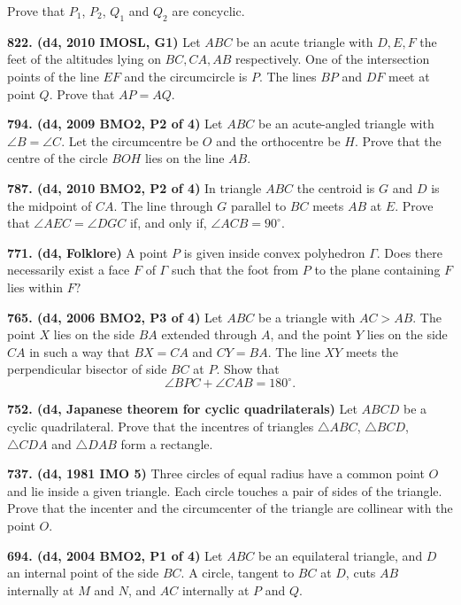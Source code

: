 \documentclass{article}
\begin{document}
Prove that $P_1$, $P_2$, $Q_1$ and $Q_2$ are concyclic.

\textbf{822. (\color{red}d4\color{black}, 2010 IMOSL, G1)} Let $ABC$ be an acute triangle with $D, E, F$ the feet of the altitudes lying on $BC, CA, AB$ respectively. One of the intersection points of the line $EF$ and the circumcircle is $P.$ The lines $BP$ and $DF$ meet at point $Q.$ Prove that $AP = AQ.$


\textbf{794. (\color{red}d4\color{black}, 2009 BMO2, P2 of 4)} Let $ABC$ be an acute-angled triangle with $\angle B=\angle C$. Let the circumcentre be $O$ and the orthocentre be $H$. Prove that the centre of the circle $BOH$ lies on the line $AB$.

\textbf{787. (\color{red}d4\color{black}, 2010 BMO2, P2 of 4)} In triangle $ABC$ the centroid is $G$ and $D$ is the midpoint of $CA$. The line through $G$ parallel to $BC$ meets $AB$ at $E$. Prove that $\angle AEC = \angle DGC$ if, and only if, $\angle ACB = 90^{\circ}$.

\textbf{771. (\color{red}d4\color{black}, Folklore)} A point $P$ is given inside convex polyhedron $\Gamma.$ Does there necessarily exist a face $F$ of $\Gamma$ such that the foot from $P$ to the plane containing $F$ lies within $F?$

\textbf{765. (\color{red}d4\color{black}, 2006 BMO2, P3 of 4)} Let $ABC$ be a triangle with $AC>AB$. The point $X$ lies on the side $BA$ extended through $A$, and the point $Y$ lies on the side $CA$ in such a way that $BX=CA$ and $CY=BA$. The line $XY$ meets the perpendicular bisector of side $BC$ at $P$. Show that $$\angle BPC + \angle CAB = 180^{\circ}.$$

\textbf{752. (\color{red}d4\color{black}, Japanese theorem for cyclic quadrilaterals)} Let $ABCD$ be a cyclic quadrilateral. Prove that the incentres of triangles $\triangle ABC$, $\triangle BCD$, $\triangle CDA$ and $\triangle DAB$ form a rectangle.

\textbf{737. (\color{red}d4\color{black}, 1981 IMO 5)} Three circles of equal radius have a common point $O$ and lie inside a given triangle. Each circle touches a pair of sides of the triangle. Prove that the incenter and the circumcenter of the triangle are collinear with the point $O$.

\textbf{694. (\color{red}d4\color{black}, 2004 BMO2, P1 of 4)} Let $ABC$ be an equilateral triangle, and $D$ an internal point of the side $BC$. A circle, tangent to $BC$ at $D$, cuts $AB$ internally at $M$ and $N$, and $AC$ internally at $P$ and $Q$.
\end{document}
